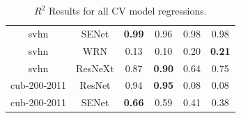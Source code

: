 \begin{table}[t]
\begin{center}
\begin{tabular}{|c|c|c|c|c|c|}
 svhn & SENet  & \textbf{0.99} &  0.96 & 0.98 & 0.98 \\
 svhn & WRN  & 0.13 &  0.10 & 0.20 & \textbf{0.21} \\
 svhn & ResNeXt  & 0.87 &  \textbf{0.90} & 0.64 & 0.75 \\
\hline
 cub-200-2011 & ResNet  & 0.94 &  \textbf{0.95} & 0.08 & 0.08 \\
 cub-200-2011 & SENet  & \textbf{0.66} &  0.59 & 0.41 & 0.38 \\
\hline
\end{tabular}
\end{center}
\caption{$R^{2}$ Results for all CV model regressions. }
\label{table:R2results}
\end{table}
